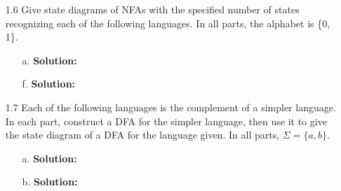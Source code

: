 \begin{enumerate}
\item[1.6]Give state diagrams of NFAs with the specified number of states recognizing each of the following languages. In all parts, the alphabet is \{0, 1\}.
\begin{enumerate}
\item[a.]\textbf{Solution:} \alreadyanswered
\item[f.]\textbf{Solution:} \alreadyanswered
\end{enumerate}

\item[1.7]Each of the following languages is the complement of a simpler language. In each part, construct a DFA for the simpler language, then use it to give the state diagram of a DFA for the language given. In all parts, $\Sigma = \{a, b\}$.
\begin{enumerate}
\item[a.]\textbf{Solution:} \alreadyanswered
\item[b.]\textbf{Solution:} \alreadyanswered
\end{enumerate}


\end{enumerate}
